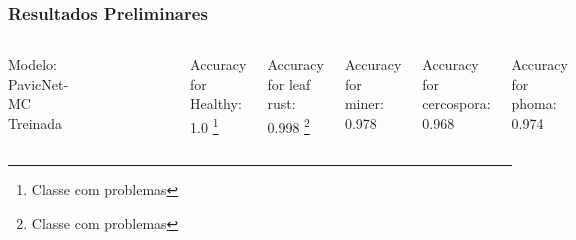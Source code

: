 \documentclass[aspectratio=169]{beamer}
\begin{document}
\begin{frame}
    \frametitle{Resultados Preliminares}

    \centering


    \begin{columns}



        \centering
        \tiny Modelo: PavicNet-MC Treinada
        \begin{figure}
            \centering
            \includegraphics[scale=0.5]{img/Pavicnetresult1.png}
            \label{fig:enter-label}
        \end{figure}
        \centering

        Accuracy for Healthy: 1.0 \footnote{Classe com problemas}

        Accuracy for leaf rust: 0.998 \footnote{Classe com problemas}

        Accuracy for miner: 0.978

        Accuracy for cercospora: 0.968

        Accuracy for phoma: 0.974




    \end{columns}
\end{frame}

\end{document}
